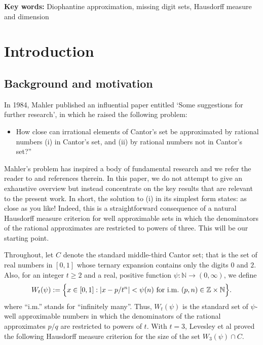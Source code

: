 \documentclass[12pt]{article}
\theoremstyle{definition}
\theoremstyle{remark}
\begin{document}
\vskip0.5cm \begin{center} {\footnotesize {\bf Key words:} Diophantine approximation, missing digit sets, Hausdorff measure and dimension}
            \end{center}







\section{Introduction}
\subsection{Background and motivation}
In 1984, Mahler published an influential paper \cite{M1984} entitled `Some suggestions for further research', in which he raised the following problem:
\begin{itemize}
\item[``\!\!]How close can irrational elements of Cantor's set be approximated by rational numbers (i) in Cantor's set, and (ii)  by rational numbers not in Cantor's set?''
\end{itemize}
Mahler's problem has inspired a body of fundamental research and we refer the reader to \cite{ABCY2023,ACY2023,B2024, B2025,BHZ2024,BHZ2025,B2008,BD2016,FD2014,FD2015,
KL2023,LSV2007,LLW2025,S2021,TWW2024,WWX2017,W2001,Y2021} and references therein. In this paper, we do not attempt to give an exhaustive overview but instead concentrate on the key results that are relevant to the present work.  In short, the solution to  (i) in its simplest form  states:  as close as you like!  Indeed, this is a straightforward consequence of a natural Hausdorff measure criterion for well approximable sets  in which the denominators of the rational approximates are restricted to powers of three.    This will be our starting point.

Throughout,  let $C$   denote the standard  middle-third Cantor set; that is the set of real numbers in $[0,1]$ whose ternary expansion contains only the digits $0$ and $2$.  Also, for an integer $t \ge 2$ and
 a real, positive function $\psi:\mathbb{N}\to(0,\infty)$, we define
\begin{equation} \label{dioset}
W_{t}(\psi) :=\Big\{x\in[0,1]:\left|x-
p/t^n
\right|<\psi(n)\ {\rm for\ i.m.}\ (p,n)\in\mathbb{Z}\times\mathbb{N}\Big\}.
\end{equation}
where ``i.m.'' stands for ``infinitely many''. Thus,  $W_{t}(\psi)$  is the standard set of $\psi$-well approximable numbers in which the  denominators of the rational approximates $p/q$ are restricted to powers of $t$.  With $t=3$,  Levesley et al \cite[Theorem 1]{LSV2007} proved  the  following Hausdorff measure criterion for the size of the set $W_{3}(\psi)\cap C$.
\end{document}
